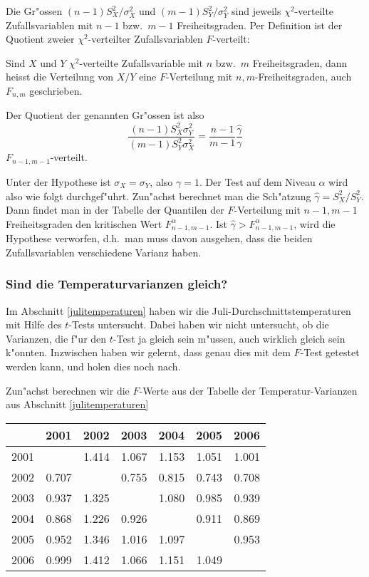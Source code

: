 Die Gr"ossen $(n-1)S_X^2/\sigma_X^2$ und $(m-1)S_Y^2/\sigma_Y^2$ sind jeweils
$\chi^2$-verteilte Zufallsvariablen mit $n-1$ bzw.~$m-1$ Freiheitsgraden.
Per Definition ist der Quotient zweier $\chi^2$-verteilter Zufallsvariablen
$F$-verteilt:
\begin{definition}
Sind $X$ und $Y$ $\chi^2$-verteilte Zufallsvariable mit $n$ bzw.~$m$
Freiheitsgraden, dann heisst die Verteilung von $X/Y$ eine $F$-Verteilung
mit $n,m$-Freiheitsgraden, auch $F_{n,m}$ geschrieben.
\end{definition}
Der Quotient der genannten Gr"ossen ist also
\begin{equation}
\frac{(n-1)S_X^2\sigma_Y^2}{(m-1)S_Y^2\sigma_X^2}
=\frac{n-1}{m-1}\frac{\hat\gamma}{\gamma}
\end{equation}
$F_{n-1,m-1}$-verteilt.

Unter der Hypothese ist $\sigma_X=\sigma_Y$, also $\gamma=1$.
Der Test auf dem Niveau $\alpha$ wird also wie folgt durchgef"uhrt.
Zun"achst berechnet man die Sch"atzung $\hat\gamma=S_X^2/S_Y^2$. Dann
findet man in der Tabelle der Quantilen der $F$-Verteilung mit $n-1,m-1$
Freiheitsgraden den kritischen Wert $F_{n-1,m-1}^\alpha$. Ist
$\hat\gamma>F_{n-1,m-1}^\alpha$, wird die Hypothese verworfen,
d.h.~man muss davon ausgehen, dass die beiden Zufallsvariablen verschiedene
Varianz haben.

\subsubsection{Sind die Temperaturvarianzen gleich?}
Im Abschnitt \ref{julitemperaturen} haben wir die
Juli-Durchschnittstemperaturen mit Hilfe des $t$-Tests untersucht.
Dabei haben wir nicht untersucht, ob die Varianzen, die f"ur den
$t$-Test ja gleich sein m"ussen, auch wirklich gleich sein k"onnten.
Inzwischen haben wir gelernt, dass genau dies mit dem $F$-Test getestet
werden kann, und holen dies noch nach.

Zun"achst berechnen wir die $F$-Werte aus der Tabelle der Temperatur-Varianzen
aus Abschnitt \ref{julitemperaturen}

\begin{center}
\begin{tabular}{|r|rrrrrr|}
\hline
&2001&2002&2003&2004&2005&2006\\
\hline
2001&      & 1.414& 1.067& 1.153& 1.051& 1.001\\
2002& 0.707&      & 0.755& 0.815& 0.743& 0.708\\
2003& 0.937& 1.325&      & 1.080& 0.985& 0.939\\
2004& 0.868& 1.226& 0.926&      & 0.911& 0.869\\
2005& 0.952& 1.346& 1.016& 1.097&      & 0.953\\
2006& 0.999& 1.412& 1.066& 1.151& 1.049&      \\
\hline
\end{tabular}
\end{center}


